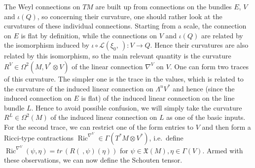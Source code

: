 \documentclass[11pt]{amsart}
\newcommand{\Ric}{\operatorname{Ric}}
\numberwithin{proposition}{section}
\numberwithin{equation}{section}
\begin{document}
The Weyl connections on $TM$ are built up from connections on the bundles $E$, $V$ and $\iota(Q)$, so concerning their curvature, one should rather look at the curvatures of these individual connections. Starting from a scale, the connection on $E$ is flat by definition, while the connections on $V$ and $\iota(Q)$ are related by the isomorphism induced by $\iota\circ\mathcal L(\xi_0,\ ):V\to Q$. Hence their curvatures are also related by this isomorphism, so the main relevant quantity is the curvature $R^V\in\Omega^2(M,V^*\otimes V)$ of the linear connection $\nabla^V$ on $V$. One can form two traces of this curvature. The simpler one is the trace in the values, which is related to the curvature of the induced linear connection on $\Lambda^nV^*$ and hence (since the induced connection on $E$ is flat) of the induced linear connection on the line bundle $L$. Hence to avoid possible confusion, we will simply take the curvature $R^L\in\Omega^2(M)$ of the induced linear connection on $L$ as one of the basic inputs. For the second trace, we can restrict one of the form entries to $V$ and then form a Ricci-type contractions $\Ric^{\nabla^V}\in\Gamma(T^*M\otimes V^*)$, i.e.\ define  $\Ric^{\nabla^V}(\psi,\eta)=tr\,(R(\ ,\psi)(\eta))$ for $\psi\in\mathfrak X(M),\eta\in\Gamma(V)$. Armed with these observations, we can now define the Schouten tensor. 
\end{document}
